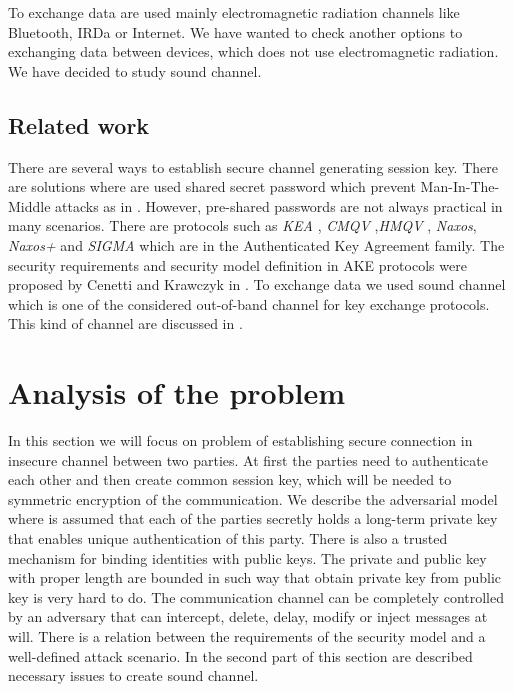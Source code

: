 \documentclass[11pt,titlepage]{article}
\theoremstyle{plain}
\begin{document}
\vspace{5mm}

To exchange data are used mainly electromagnetic radiation channels like Bluetooth, IRDa or Internet. We have wanted to check another options to exchanging data between devices, which does not use electromagnetic radiation. We have decided to study sound channel.









\subsection{Related work}
There are several ways to establish secure channel generating session key.
There are solutions where are used shared secret password which prevent Man-In-The-Middle attacks as in \cite{EKE, EKE2}. However, pre-shared passwords are not always practical in many scenarios. There are protocols such as \textit{KEA} \cite{KEA}, \textit{CMQV} \cite{CMQV},\textit{HMQV} \cite{HMQV}, \textit{Naxos}, \textit{Naxos+} \cite{NAXOS} and \textit{SIGMA} \cite{sign_mac} which are in the Authenticated Key Agreement family. The security requirements and security model definition in AKE protocols were proposed by Cenetti and Krawczyk in \cite{security_canetti_krawczyk, key_exchange}. To exchange data we used sound channel which is one of the considered out-of-band channel for key exchange protocols. This kind of channel are discussed in \cite{chirp, sib, ad_hoc, veh, vibrat}.


\section{Analysis of the problem}

In this section we will focus on problem of establishing secure connection in insecure channel between two parties. At first the parties need to authenticate each other and then create common session key, which will be needed to symmetric encryption of the communication. We describe the adversarial model where is assumed that each of the parties secretly holds a long-term private key that enables unique authentication of this party. There is also a trusted mechanism for binding identities with public keys. The private and public key with proper length are bounded in such way that obtain private key from public key is very hard to do. The communication channel can be completely controlled by an adversary that can intercept, delete, delay, modify or inject messages at will. There is a relation between the requirements of the security model and a well-defined attack scenario. In the second part of this section are described necessary issues to create sound channel.
\end{document}
